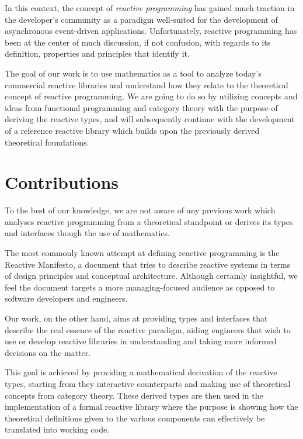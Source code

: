 In this context, the concept of \textit{reactive programming} has gained much traction in the developer's community as a paradigm well-suited for the development of asynchronous  event-driven applications\cite{bainomugisha2013survey}. Unfortunately, reactive programming has been at the center of much discussion, if not confusion, with regards to its definition, properties and principles that identify it\cite{meijer2014reactive}.

The goal of our work is to use mathematics as a tool to analyze today's commercial reactive libraries and understand how they relate to the theoretical concept of reactive programming.  We are going to do so by utilizing concepts and ideas from functional programming and category theory with the purpose of deriving the reactive types, and will subsequently continue with the development of a reference reactive library which builds upon the previously derived theoretical foundations. 

\section*{Contributions}

To the best of our knowledge, we are not aware of any previous work which analyses reactive programming from a theoretical standpoint or derives its types and interfaces though the use of mathematics.

The most commonly known attempt at defining reactive programming is the Reactive Manifesto\cite{reactive-manifesto}, a document that tries to describe reactive systems in terms of design principles and conceptual architecture. Although certainly insightful, we feel the document targets a more managing-focused audience as opposed to software developers and engineers. 

Our work, on the other hand, aims at providing types and interfaces that describe the real essence of the reactive paradigm, aiding engineers that wish to use or develop reactive libraries in understanding and taking more informed decisions on the matter.

This goal is achieved by providing a mathematical derivation of the reactive types, starting from they interactive counterparts and making use of theoretical concepts from category theory. These derived types are then used in the implementation of a formal reactive library where the purpose is showing how the theoretical definitions given to the various components can effectively be translated into working code. 

